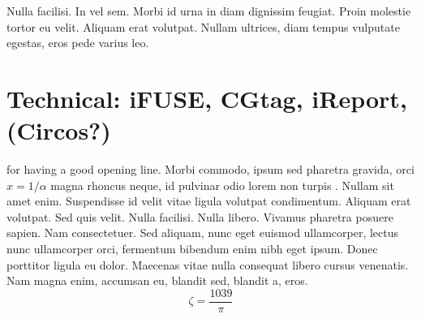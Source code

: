 \begin{savequote}[75mm]
Nulla facilisi. In vel sem. Morbi id urna in diam dignissim feugiat. Proin molestie tortor eu velit. Aliquam erat volutpat. Nullam ultrices, diam tempus vulputate egestas, eros pede varius leo.
\end{savequote}

\chapter{Technical: iFUSE, CGtag, iReport, (Circos?)}

 for having a good opening line. Morbi commodo, ipsum sed pharetra gravida, orci  $x = 1/\alpha$ magna rhoncus neque, id pulvinar odio lorem non turpis \cite{Eigen1971, Knuth1968}. Nullam sit amet enim. Suspendisse id velit vitae ligula volutpat condimentum. Aliquam erat volutpat. Sed quis velit. Nulla facilisi. Nulla libero. Vivamus pharetra posuere sapien. Nam consectetuer. Sed aliquam, nunc eget euismod ullamcorper, lectus nunc ullamcorper orci, fermentum bibendum enim nibh eget ipsum. Donec porttitor ligula eu dolor. Maecenas vitae nulla consequat libero cursus venenatis. Nam magna enim, accumsan eu, blandit sed, blandit a, eros.
$$\zeta = \frac{1039}{\pi}$$


